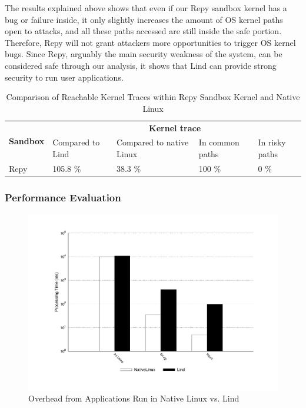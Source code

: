 {The results explained above shows that even if our Repy sandbox kernel has a
bug or failure inside,
it only slightly increases the amount of OS kernel paths open to attacks,
and all these paths accessed are still inside the safe portion.
Therefore, Repy will not grant attackers more opportunities to trigger OS
kernel bugs.
Since Repy, arguably the main security weakness of the system, can be
considered safe through our analysis,
it shows that Lind can provide strong security to run user applications.

\begin{table}
\centering
\scriptsize
\caption{Comparison of Reachable Kernel Traces within Repy Sandbox Kernel and Native Linux}
\begin{tabular}{|l|l|l|l|l|}
  \hline
  \multirow{3}{.8cm}{\bf Sandbox} & \multicolumn{4}{c|}{\bf Kernel trace} \\ \cline{2-5}
  & \multirow{2}{1cm}{Compared to Lind} &
  \multirow{2}{1.3cm}{Compared to native Linux} & \multirow{2}{1.5cm}{In common paths} &
  \multirow{2}{1.0cm}{In risky paths} \\
  & & & & \\  \hline

  Repy & 105.8 \% & 38.3 \% & 100 \%  & 0 \%  \\
  \hline
\end{tabular}
\label{table:trace-Repy}
\end{table}


\subsubsection{Performance Evaluation}
\label{Performance-Evaluation}

\begin{figure}
\centering
\includegraphics[width=1.0\columnwidth]{diagram/lind_oakland16_performance.pdf}
\caption{Overhead from Applications Run in Native Linux vs. Lind}
\label{fig:performance_applications}
\end{figure}

}
